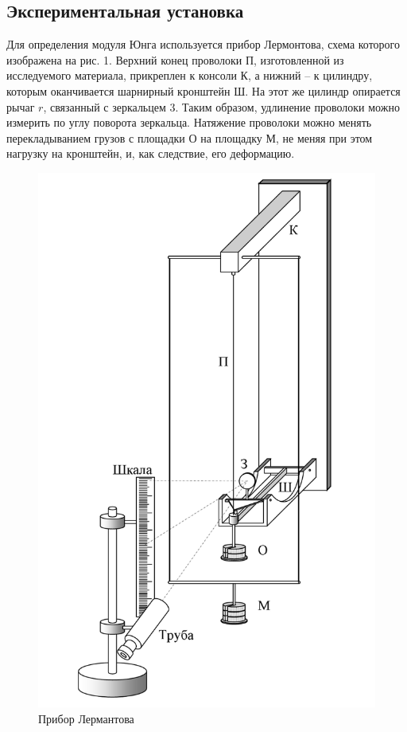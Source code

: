 \documentclass[a4paper, 12pt]{article}
\begin{document}
\begin{center}

    \newpage

    \subsection*{Экспериментальная установка}

    \bigskip
      
    Для определения модуля Юнга используется прибор Лермонтова,
    схема которого изображена на рис. 1. Верхний конец проволоки П, изготовленной
    из исследуемого материала, прикреплен к консоли К, а
    нижний -- к цилиндру, которым оканчивается шарнирный кронштейн
    Ш. На этот же цилиндр опирается рычаг $r$, связанный с зеркальцем
    3. Таким образом, удлинение проволоки можно измерить по углу
    поворота зеркальца.
    Натяжение проволоки можно менять перекладыванием грузов
    с площадки О на площадку М, не меняя при этом нагрузку на кронштейн,
    и, как следствие, его деформацию.

    \begin{figure}[H]
        \centering
        \includegraphics[scale = 0.3]{lermantov.png}
        \caption{Прибор Лермантова}
    \end{figure}


\end{center}
\end{document}
